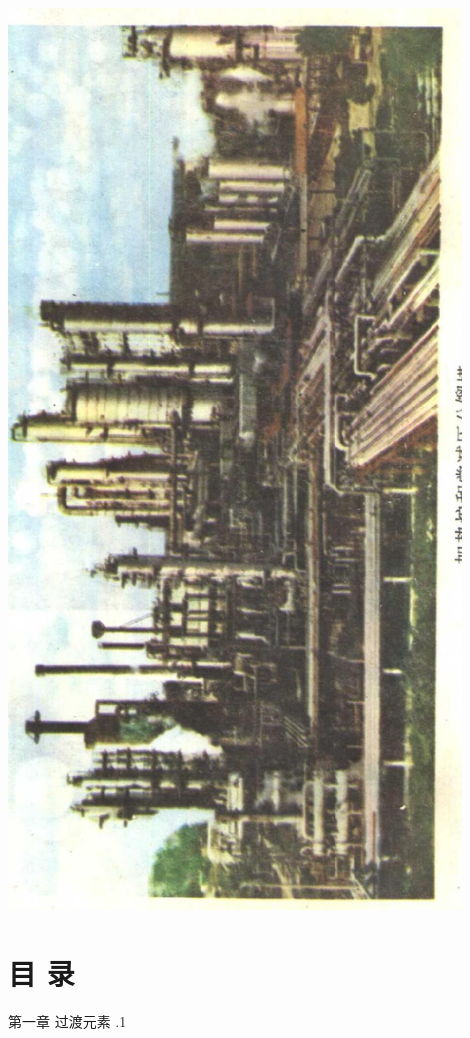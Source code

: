 \documentclass[10pt]{article}
\begin{document}
\begin{center}
\includegraphics[max width=0.9\textwidth]{images/01912d16-be99-77bb-9535-4f3ed8d9946f_5_739660.jpg}
\end{center}

\section*{目 录}

第一章 过渡元素 .1
\end{document}
